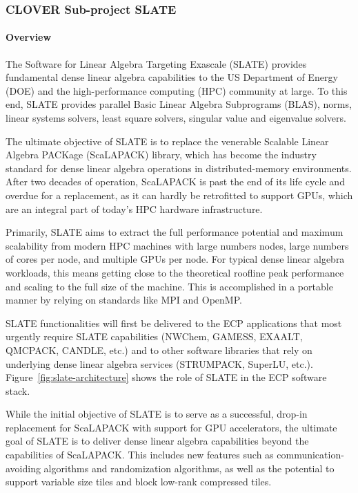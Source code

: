 \subsubsection{CLOVER Sub-project SLATE}\label{subsubsect:slate}

\paragraph{Overview}

The Software for Linear Algebra Targeting Exascale (SLATE)
provides fundamental dense linear algebra capabilities
to the US Department of Energy (DOE)
and the high-performance computing (HPC) community at large.
To this end, SLATE provides
parallel Basic Linear Algebra Subprograms (BLAS), norms,
linear systems solvers, least square solvers,
singular value and eigenvalue solvers.

The ultimate objective of SLATE is to replace the
venerable Scalable Linear Algebra PACKage (ScaLAPACK) library,
which has become the industry standard for dense linear algebra operations
in distributed-memory environments.
After two decades of operation,
ScaLAPACK is past the end of its life cycle and overdue for a replacement,
as it can hardly be retrofitted to support GPUs,
which are an integral part of today's HPC hardware infrastructure.

Primarily, SLATE aims to extract the full performance potential and maximum
scalability from modern HPC machines with large numbers nodes,
large numbers of cores per node, and multiple GPUs per node.
For typical dense linear algebra workloads, this means getting close
to the theoretical roofline peak performance and scaling to the full size of
the machine.
This is accomplished in a portable manner by relying on standards
like MPI and OpenMP.

SLATE functionalities will first be delivered to the ECP applications
that most urgently require SLATE capabilities
(NWChem, GAMESS, EXAALT, QMCPACK, CANDLE, etc.)
and to other software libraries
that rely on underlying dense linear algebra services
(STRUMPACK, SuperLU, etc.).
Figure~\ref{fig:slate-architecture} shows the role of SLATE
in the ECP software stack.

While the initial objective of SLATE is to serve as a successful,
drop-in replacement for ScaLAPACK with support for GPU accelerators,
the ultimate goal of SLATE is to deliver dense linear algebra capabilities
beyond the capabilities of ScaLAPACK.
This includes new features such as communication-avoiding
algorithms and randomization algorithms, as well as the potential to
support variable size tiles and block low-rank compressed tiles.


